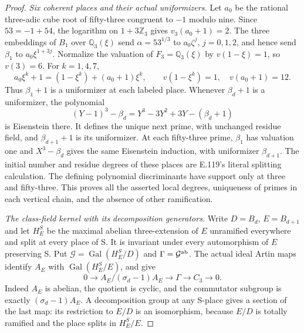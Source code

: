 \begin{proof}
\emph{Six coherent places and their actual uniformizers.}
Let $a_0$ be the rational three-adic cube root of fifty-three
congruent to $-1$ modulo nine. Since $53=-1+54$, the logarithm
on $1+3\mathbb Z_3$ gives
$v_3(a_0+1)=2$. The three embeddings of $B_1$ over
$\mathbb Q_3(\xi)$ send
$\alpha=53^{1/3}$ to $a_0\zeta^j$, $j=0,1,2$, and hence send
$\beta_1$ to $a_0\xi^{1+3j}$. Normalize the valuation of
$F_3=\mathbb Q_3(\xi)$ by $v(1-\xi)=1$, so $v(3)=6$.
For $k=1,4,7$,
\[
       a_0\xi^k+1=(1-\xi^k)+(a_0+1)\xi^k,
       \qquad v(1-\xi^k)=1,\quad v(a_0+1)=12.
 \tag{E122.8}
\]
Thus $\beta_1+1$ is a uniformizer at each labeled place.
Whenever $\beta_d+1$ is a uniformizer, the polynomial
\[
       (Y-1)^3-\beta_d
       =Y^3-3Y^2+3Y-(\beta_d+1)
 \tag{E122.9}
\]
is Eisenstein there. It defines the unique next prime, with unchanged
residue field, and $\beta_{d+1}+1$ is its uniformizer. At each
fifty-three prime, $\beta_1$ has valuation one and
$X^3-\beta_d$ gives the same Eisenstein induction, with uniformizer
$\beta_{d+1}$. The initial number and residue degrees of these places
are E.119's literal splitting calculation. The defining polynomial
discriminants have support only at three and fifty-three. This proves
all the asserted local degrees, uniqueness of primes in each vertical
chain, and the absence of other ramification.

\emph{The class-field kernel with its decomposition generators.}
Write $D=B_d$, $E=B_{d+1}$ and let $H_E^S$ be the maximal abelian
three-extension of $E$ unramified everywhere and split at every place
of S. It is invariant under every automorphism of $E$ preserving S.
Put $\mathcal G=\operatorname{Gal}(H_E^S/D)$ and
$\Gamma=\mathcal G^{\rm ab}$. The actual ideal Artin maps identify
$A_E$ with $\operatorname{Gal}(H_E^S/E)$, and give
\[
 0\longrightarrow A_E/(\sigma_d-1)A_E
   \longrightarrow\Gamma\longrightarrow C_3\longrightarrow0.
 \tag{E122.10}
\]
Indeed $A_E$ is abelian, the quotient is cyclic, and the commutator
subgroup is exactly $(\sigma_d-1)A_E$. A decomposition group at any
S-place gives a section of the last map: its restriction to $E/D$
is an isomorphism, because $E/D$ is totally ramified and the place
splits in $H_E^S/E$.


\end{proof}

